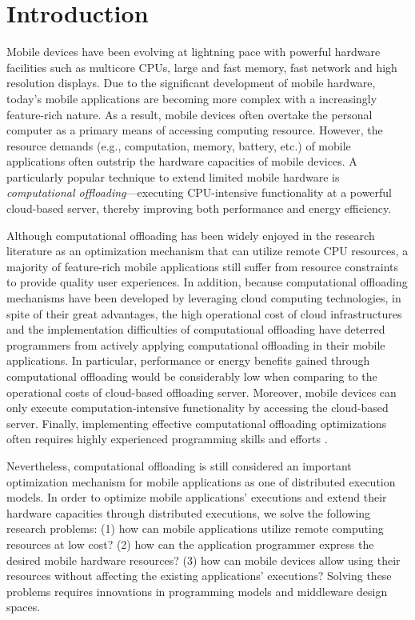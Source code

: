 \documentclass{sig-alternate}[10pt]
\begin{document}
\section{Introduction}
Mobile devices have been evolving at lightning pace with powerful hardware facilities such as multicore CPUs, large and fast memory, fast network and high resolution displays. Due to the significant development of mobile hardware, today's mobile applications are becoming more complex with a increasingly feature-rich nature. As a result, mobile devices often overtake the personal computer as a primary means of accessing computing resource. However, the resource demands (e.g., computation, memory, battery, etc.) of mobile applications often outstrip the hardware capacities of mobile devices. A particularly popular technique to extend limited mobile hardware is \emph{computational offloading}---executing CPU-intensive functionality at a powerful cloud-based server, thereby improving both performance and energy efficiency. 

Although computational offloading has been widely enjoyed in the research literature as an optimization mechanism that can utilize remote CPU resources, a majority of feature-rich mobile applications still suffer from resource constraints to provide quality user experiences. In addition, because computational offloading mechanisms have been developed by leveraging cloud computing technologies, in spite of their great advantages, the high operational cost of cloud infrastructures and the implementation difficulties of computational offloading have deterred programmers from actively applying computational offloading in their mobile applications. In particular, performance or energy benefits gained through computational offloading would be considerably low when comparing to the operational costs of cloud-based offloading server. Moreover, mobile devices can only execute computation-intensive functionality by accessing the cloud-based server. Finally, implementing effective computational offloading optimizations often requires highly experienced programming skills and efforts \cite{kwon+:mobilesoft2015}.

Nevertheless, computational offloading is still considered an important optimization mechanism for mobile applications as one of distributed execution models. In order to optimize mobile applications' executions and extend their hardware capacities through distributed executions, we solve the following research problems: (1) how can mobile applications utilize remote computing resources at low cost? (2) how can the application programmer express the desired mobile hardware resources? (3) how can mobile devices allow using their resources without affecting the existing applications' executions? Solving these problems requires innovations in programming models and middleware design spaces. 
\end{document}
